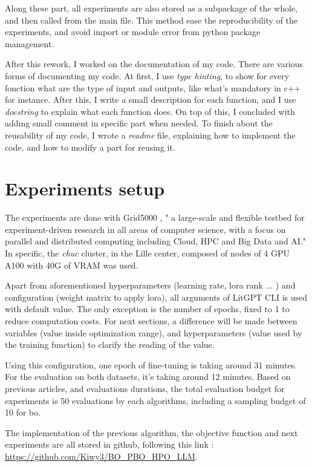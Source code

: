 Along these part, all experiments are also stored as a subpackage of the whole, and then called from the main file. This method ease the reproducibility of the experiments, and avoid import or module error from python package management. 

After this rework, I worked on the documentation of my code. There are various forms of documenting my code. At first, I use \textit{type hinting}, to show for every fonction what are the type of input and outputs, like what's mandatory in c++ for instance. After this, I write a small description for each function, and I use \textit{docstring} to explain what each function does. On top of this, I concluded with adding small comment in specific part when needed. To finish about the reusability of my code, I wrote a \textit{readme} file, explaining how to implement the code, and how to modify a part for reusing it.

\section{Experiments setup}
\label{sec:exp_setup}

The experiments are done with Grid5000 \cite{balouek_adding_2012}, " a large-scale and flexible testbed for experiment-driven research in all areas of computer science, with a focus on parallel and distributed computing including Cloud, HPC and Big Data and AI." In specific, the \textit{chuc} cluster, in the Lille center, composed of nodes of 4 GPU A100 with 40G of VRAM was used. 

Apart from aforementioned \glspl{hyperparameter} (learning rate, \acrshort{lora} rank ... ) and configuration (weight matrix to apply \acrshort{lora}), all arguments of LitGPT CLI is used with default value. The only exception is the number of epochs, fixed to 1 to reduce computation costs. For next sections, a difference will be made between variables (value inside optimization range), and \glspl{hyperparameter} (value used by the training function) to clarify the reading of the value. 

Using this configuration, one epoch of fine-tuning is taking around 31 minutes. For the evaluation on both datasets, it's taking around 12 minutes. Based on previous articles, and evaluations durations, the total evaluation budget for experiments is 50 evaluations by each algorithms, including a sampling budget of 10 for \acrlong{bo}.

The implementation of the previous algorithm, the objective function and next experiments are all stored in github, following this link : \url{https://github.com/Kiwy3/BO_PBO_HPO_LLM}.